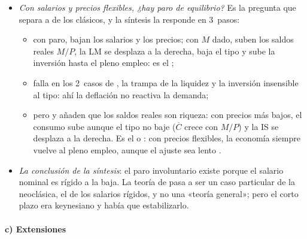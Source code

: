 \documentclass[11pt]{article}
\begin{document}
\begin{itemize}
\item \emph{Con salarios y precios flexibles, ¿hay paro de equilibrio?} Es la pregunta que separa a  de los clásicos, y la síntesis la responde en 3~pasos:
  \begin{itemize}
  \item con paro, bajan los salarios y los precios; con $M$ dado, suben los saldos reales $M/P$, la LM se desplaza a la derecha, baja el tipo y sube la inversión hasta el pleno empleo: es el ;
  \item falla en los 2~casos de , la trampa de la liquidez y la inversión insensible al tipo: ahí la deflación no reactiva la demanda;
  \item pero \textcite{Pigou1943Classical} y \textcite{Patinkin1956Money} añaden que los saldos reales son riqueza: con precios más bajos, el consumo sube aunque el tipo no baje ($\overline{C}$ crece con $M/P$) y la IS se desplaza a la derecha. Es el  o  : con precios flexibles, la economía siempre vuelve al pleno empleo, aunque el ajuste sea lento .
  \end{itemize}
\item \emph{La conclusión de la síntesis}: el paro involuntario existe porque el salario nominal es rígido a la baja\nocite{Modigliani1944Liquidity}. La teoría de  pasa a ser un caso particular de la neoclásica, el de los salarios rígidos, y no una «teoría general»; pero el corto plazo era keynesiano y había que estabilizarlo.
\end{itemize}

\paragraph{c) Extensiones}
\end{document}
